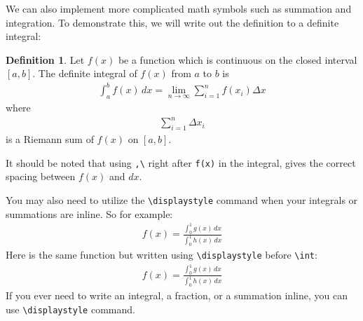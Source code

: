 \documentclass[]{article}%
\newcommand{\bs}{\textbackslash}
\newcommand{\TT}[1]{\texttt{#1}}
\theoremstyle{definition}
\newtheorem{dfn}{Definition}
\begin{document}
%
We can also implement more complicated math symbols such as summation and integration.
To demonstrate this, we will write out the definition to a definite integral:
\begin{dfn}
	Let $f(x)$ be a function which is continuous on the closed interval $[a,b]$. The definite integral of $f(x)$ from $a$ to $b$ is
	\begin{align*}
 		\int_a^b f(x)\,dx = \lim_{n\rightarrow \infty} \sum_{i=1}^n f(x_i) \Delta x 
	\end{align*}
	where
	\begin{align*}
 		\sum_{i=1}^n \Delta x_i 
	\end{align*}
	is a Riemann sum of $f(x)$ on $[a,b]$.
\end{dfn}
\noindent It should be noted that using \TT{,\bs} right after \TT{f(x)} in the integral, gives the correct spacing between $f(x)$ and $dx$.

You may also need to utilize the \TT{\bs displaystyle} command when your integrals or summations are inline. So for example:
\begin{align}
	f(x) = \frac{\int_0^1g(x)\,dx}{\int_0^1h(x)\,dx}
\end{align}
Here is the same function but written using \TT{\bs displaystyle} before \TT{\bs int}:
\begin{align}
	f(x) = \frac{\displaystyle\int_0^1g(x)\,dx}{\displaystyle\int_0^1h(x)\,dx}
\end{align}
If you ever need to write an integral, a fraction, or a summation inline, you can use \TT{\bs displaystyle} command.
\end{document}
